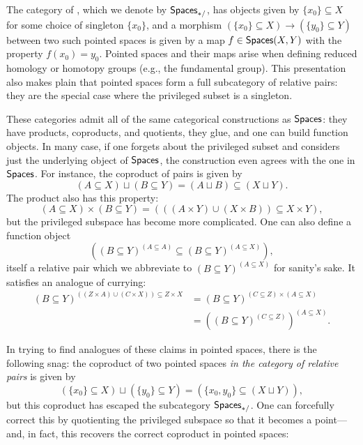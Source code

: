 \begin{definition}
The category of , which we denote by $\mathsf{Spaces}_{*/}$, has objects given by $\{x_0\} \subseteq X$ for some choice of singleton $\{x_0\}$, and a morphism $(\{x_0\} \subseteq X) \to (\{y_0\} \subseteq Y)$ between two such pointed spaces is given by a map $f \in \mathsf{Spaces}(X, Y)$ with the property $f(x_0) = y_0$.
Pointed spaces and their maps arise when defining reduced homology or homotopy groups (e.g., the fundamental group).
This presentation also makes plain that pointed spaces form a full subcategory of relative pairs: they are the special case where the privileged subset is a singleton.
\end{definition}

These categories admit all of the same categorical constructions as $\mathsf{Spaces}$: they have products, coproducts, and quotients, they glue, and one can build function objects.
In many case, if one forgets about the privileged subset and considers just the underlying object of $\mathsf{Spaces}$, the construction even agrees with the one in $\mathsf{Spaces}$.
For instance, the coproduct of pairs is given by \[(A \subseteq X) \sqcup (B \subseteq Y) = (A \sqcup B) \subseteq (X \sqcup Y).\]
The product also has this property: \[(A \subseteq X) \times (B \subseteq Y) = (((A \times Y) \cup (X \times B)) \subseteq X \times Y),\] but the privileged subspace has become more complicated.
One can also define a function object \[((B \subseteq Y)^{(A \subseteq A)} \subseteq (B \subseteq Y)^{(A \subseteq X)}),\] itself a relative pair which we abbreviate to $(B \subseteq Y)^{(A \subseteq X)}$ for sanity's sake.
It satisfies an analogue of currying:%
\begin{align*}
(B \subseteq Y)^{((Z \times A) \cup (C \times X)) \subseteq Z \times X} & = (B \subseteq Y)^{(C \subseteq Z) \times (A \subseteq X)} \\
& = \left( (B \subseteq Y)^{(C \subseteq Z)} \right)^{(A \subseteq X)}.
\end{align*}

In trying to find analogues of these claims in pointed spaces, there is the following snag: the coproduct of two pointed spaces \emph{in the category of relative pairs} is given by \[(\{x_0\} \subseteq X) \sqcup (\{y_0\} \subseteq Y) = (\{x_0, y_0\} \subseteq (X \sqcup Y)),\] but this coproduct has escaped the subcategory $\mathsf{Spaces}_{*/}$.
One can forcefully correct this by quotienting the privileged subspace so that it becomes a point---and, in fact, this recovers the correct coproduct in pointed spaces:

